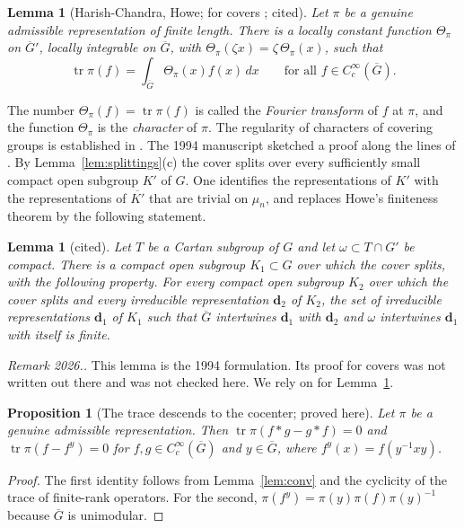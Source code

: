 \documentclass[12pt,letterpaper]{article}
\numberwithin{equation}{section}
\newtheorem{lemma}[theorem]{Lemma}
\newtheorem{xproposition}[theorem]{Proposition}
\theoremstyle{definition}
\newcounter{rmk}
\newcommand{\unverified}[1]{\refstepcounter{rmk}\par\smallskip\noindent\textit{Remark 2026.\arabic{rmk}.} #1\par\smallskip}
\newcommand{\proved}{proved here}
\newcommand{\cited}{cited}
\newcommand{\bG}{\overline{G}}
\DeclareMathOperator{\tr}{tr}
\begin{document}
\begin{lemma}[Harish-Chandra, Howe; for covers \cite{Li12}; \cited]\label{lem:character}
Let $\pi$ be a genuine admissible representation of finite length.  There is a locally
constant function $\Theta_\pi$ on $\bG'$, locally integrable on $\bG$, with
$\Theta_\pi(\zeta x)=\zeta\,\Theta_\pi(x)$, such that
\[
\tr\pi(f)=\int_{\bG}\Theta_\pi(x)f(x)\,dx\qquad\text{for all }f\in C_c^\infty(\bG).
\]
\end{lemma}
The number $\Theta_\pi(f)=\tr\pi(f)$ is called the \emph{Fourier transform} of $f$ at
$\pi$, and the function $\Theta_\pi$ is the \emph{character} of $\pi$.  The regularity of
characters of covering groups is established in \cite[\S4]{Li12}.  The 1994 manuscript
sketched a proof along the lines of \cite[Corollary~4.8.2]{Si79}.  By
Lemma~\ref{lem:splittings}(c) the cover splits over every sufficiently small compact open
subgroup $K'$ of $G$.  One identifies the representations of $K'$ with the representations
of $\overline{K'}$ that are trivial on $\mu_n$, and replaces Howe's finiteness theorem
\cite[Theorem~4.8.1]{Si79} by the following statement.

\begin{lemma}[\cited]\label{lem:howe}
Let $T$ be a Cartan subgroup of $G$ and let $\omega\subset T\cap G'$ be compact.  There is a
compact open subgroup $K_1\subset G$ over which the cover splits, with the following
property.  For every compact open subgroup $K_2$ over which the cover splits and every
irreducible representation $\mathbf d_2$ of $K_2$, the set of irreducible representations
$\mathbf d_1$ of $K_1$ such that $\bG$ intertwines $\mathbf d_1$ with $\mathbf d_2$ and
$\omega$ intertwines $\mathbf d_1$ with itself is finite.
\end{lemma}
\unverified{This lemma is the 1994 formulation.  Its proof for covers was not written out
there and was not checked here.  We rely on \cite{Li12} for Lemma~\ref{lem:character}.}

\begin{xproposition}[The trace descends to the cocenter; \proved]\label{prop:cocenter}
Let $\pi$ be a genuine admissible representation.  Then $\tr\pi(f*g-g*f)=0$ and
$\tr\pi(f-f^y)=0$ for $f,g\in C_c^\infty(\bG)$ and $y\in\bG$, where
$f^y(x)=f(y^{-1}xy)$.
\end{xproposition}
\begin{proof}
The first identity follows from Lemma~\ref{lem:conv} and the cyclicity of the trace of
finite-rank operators.  For the second, $\pi(f^y)=\pi(y)\pi(f)\pi(y)^{-1}$ because $\bG$ is
unimodular.
\end{proof}
\end{document}

